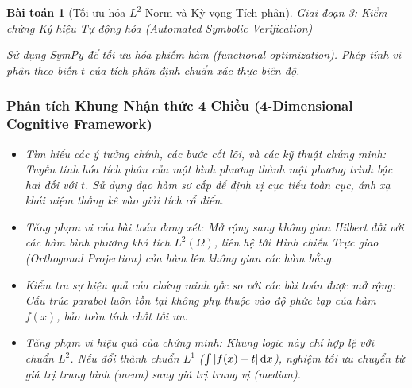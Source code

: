 \documentclass{article}
\newtheorem{baitoan}{Bài toán}
\begin{document}
\begin{baitoan}[Tối ưu hóa $L^2$-Norm và Kỳ vọng Tích phân]


\vspace{0.5em}\noindent\emph{Giai đoạn 3: Kiểm chứng Ký hiệu Tự động hóa (Automated Symbolic Verification)}
 
 Sử dụng \textsf{SymPy} để tối ưu hóa phiếm hàm (functional optimization). Phép tính vi phân theo biến $t$ của tích phân định chuẩn xác thực biên độ.



 \subsubsection*{Phân tích Khung Nhận thức 4 Chiều (4-Dimensional Cognitive Framework)}
 \begin{itemize}
 \item \textit{Tìm hiểu các ý tưởng chính, các bước cốt lõi, và các kỹ thuật chứng minh}: Tuyến tính hóa tích phân của một bình phương thành một phương trình bậc hai đối với $t$. Sử dụng đạo hàm sơ cấp để định vị cực tiểu toàn cục, ánh xạ khái niệm thống kê vào giải tích cổ điển.
 \item \textit{Tăng phạm vi của bài toán đang xét}: Mở rộng sang không gian Hilbert đối với các hàm bình phương khả tích $L^2(\Omega)$, liên hệ tới Hình chiếu Trực giao (Orthogonal Projection) của hàm lên không gian các hàm hằng.
 \item \textit{Kiểm tra sự hiệu quả của chứng minh gốc so với các bài toán được mở rộng}: Cấu trúc parabol luôn tồn tại không phụ thuộc vào độ phức tạp của hàm $f(x)$, bảo toàn tính chất tối ưu.
 \item \textit{Tăng phạm vi hiệu quả của chứng minh}: Khung logic này chỉ hợp lệ với chuẩn $L^2$. Nếu đổi thành chuẩn $L^1$ ($\int |f(x) - t|\,{\rm d}x$), nghiệm tối ưu chuyển từ giá trị trung bình (mean) sang giá trị trung vị (median).
 \end{itemize}
\end{baitoan}

\end{document}
